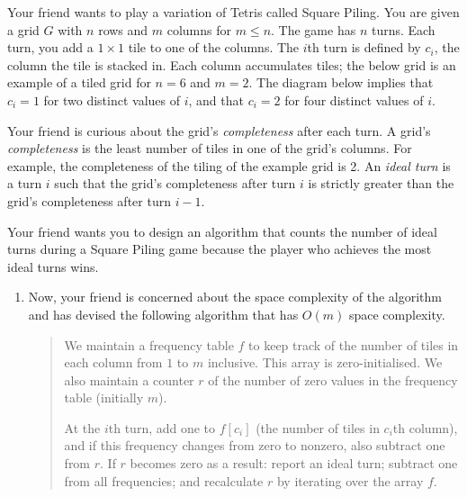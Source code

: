 \documentclass[12pt]{article}
\begin{document}

\begin{question}
Your friend wants to play a variation of Tetris called Square Piling. You are given a grid $G$ with $n$ rows and $m$ columns for $m \leq n$. The game has $n$ turns. Each turn, you add a $1\times1$ tile to one of the columns. The $i$th turn is defined by $c_i$, the column the tile is stacked in. Each column accumulates tiles; the below grid is an example of a tiled grid for $n = 6$ and $m = 2$. The diagram below implies that $c_i = 1$ for two distinct values of $i$, and that $c_i = 2$ for four distinct values of $i$. 

\begin{center}
\end{center}

Your friend is curious about the grid's \emph{completeness} after each turn. A grid's \emph{completeness} is the least number of tiles in one of the grid's columns. For example, the completeness of the tiling of the example grid is 2. An \emph{ideal turn} is a turn $i$ such that the grid's completeness after turn $i$ is strictly greater than the grid's completeness after turn $i-1$. 

Your friend wants you to design an algorithm that counts the number of ideal turns during a Square Piling game because the player who achieves the most ideal turns wins.

\begin{enumerate}
	\item Now, your friend is concerned about the space complexity of the algorithm and has devised the following algorithm that has $O(m)$ space complexity.
 
 \begin{quote}
    We maintain a frequency table $f$ to keep track of the number of tiles in each column from $1$ to $m$ inclusive. This array is zero-initialised. We also maintain a counter $r$ of the number of zero values in the frequency table (initially $m$).
    
    At the $i$th turn, add one to $f[c_i]$ (the number of tiles in $c_i$th column), and if this frequency changes from zero to nonzero, also subtract one from $r$. If $r$ becomes zero as a result: report an ideal turn; subtract one from all frequencies; and recalculate $r$ by iterating over the array $f$.
\end{quote}
 

\end{enumerate}
\end{question}
\end{document}
